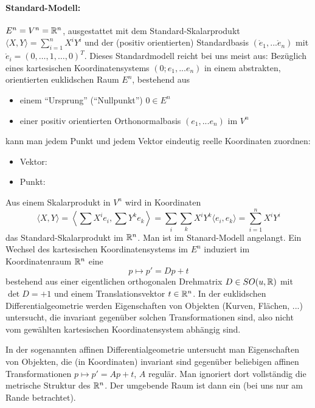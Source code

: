\paragraph*{Standard-Modell:} \(E^n = V^n = \mathbb{R}^n\), ausgestattet mit dem Standard-Skalarprodukt \(\langle X, Y \rangle = \sum_{i=1}^n X^iY^i\) und der (positiv orientierten) Standardbasis \((\mathring{e}_1, ... \mathring{e}_n)\) mit \(\mathring{e}_i = (0, \dots, 1, \dots, 0)^T\).
Dieses Standardmodell reicht bei uns meist aus:
Bezüglich eines kartesischen Koordinatensystems \((0; e_1, ... e_n)\) in einem abstrakten, orientierten euklidschen Raum \(E^n\), bestehend aus 
  \begin{itemize}
   \item einem "`Ursprung"' ("`Nullpunkt"') \(0 \in E^n\)
   \item einer positiv orientierten Orthonormalbasis \((e_1, ... e_n)\) im \(V^n\)
  \end{itemize}
kann man jedem Punkt und jedem Vektor eindeutig reelle Koordinaten zuordnen:
  \begin{itemize}
   \item Vektor: 
   \item Punkt: 
  \end{itemize}
Aus einem Skalarprodukt in \(V^n\) wird in Koordinaten
  \[
   \langle X, Y \rangle = \left\langle \sum X^ie_i, \sum Y^ke_k \right\rangle = \sum_{i}\sum_{k} X^iY^k \langle e_i, e_k \rangle = \sum_{i=1}^n X^iY^i
  \]
das Standard-Skalarprodukt im \(\mathbb{R}^n\).
Man ist im Stanard-Modell angelangt.
Ein Wechsel des kartesischen Koordinatensystems im \(E^n\) induziert im Koordinatenraum \(\mathbb{R}^n\) eine  \[p \mapsto p' = Dp + t\] bestehend aus einer eigentlichen orthogonalen Drehmatrix \(D \in SO(u, \mathbb{R})\) mit \(\det D = +1\) und einem Translationsvektor \(t \in \mathbb{R}^n\).
In der euklidschen Differentialgeometrie werden Eigenschaften von Objekten (Kurven, Flächen, ...) untersucht, die invariant gegenüber solchen Transformationen sind, also nicht vom gewählten kartesischen Koordinatensystem abhängig sind. \\
  \begin{bemerkung} In der sogenannten affinen Differentialgeometrie untersucht man Eigenschaften von Objekten, die (in Koordinaten) invariant sind gegenüber beliebigen affinen Transformationen \(p \mapsto p' = Ap + t\), \(A\) regulär. Man ignoriert dort vollständig die metrische Struktur des \(\mathbb{R}^n\).
  Der umgebende Raum ist dann ein  (bei uns nur am Rande betrachtet).
  \end{bemerkung}
